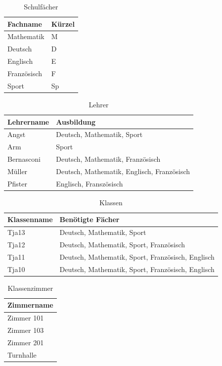 \begin{table}[ht]
\centering
  \begin{tabular}{ l | l }
	\hline
	\rowcolor{gray}
	\textbf{Fachname}	& \textbf{Kürzel}\\ \hline
	Mathematik		& M\\ \hline
	Deutsch		& D\\ \hline
	Englisch		& E\\ \hline
	Französisch		& F\\ \hline
	Sport			& Sp
  \end{tabular}
   \caption{Schulfächer}\label{table:eg_subject}
\end{table}

\begin{table}[ht]
\centering
  \begin{tabular}{ l | l }
	\hline
	\rowcolor{gray}
	\textbf{Lehrername} 	& \textbf{Ausbildung}\\ \hline
	Angst				& Deutsch, Mathematik, Sport\\ \hline
	Arm				& Sport\\ \hline
	Bernasconi			& Deutsch, Mathematik, Französisch\\ \hline
	Müller				& Deutsch, Mathematik, Englisch, Französisch\\ \hline
	Pfister				& Englisch, Franszösisch
  \end{tabular}
   \caption{Lehrer}\label{table:eg_teacher}
\end{table}

\begin{table}[ht]
\centering
  \begin{tabular}{ l | l }
	\hline
	\rowcolor{gray}
	\textbf{Klassenname} 	& \textbf{Benötigte Fächer}\\ \hline
	Tja13				& Deutsch, Mathematik, Sport\\ \hline
	Tja12				& Deutsch, Mathematik, Sport, Französisch\\ \hline
	Tja11				& Deutsch, Mathematik, Sport, Französisch, Englisch\\ \hline
	Tja10				& Deutsch, Mathematik, Sport, Französisch, Englisch
  \end{tabular}
   \caption{Klassen}\label{table:eg_schoolclasses}
\end{table}

\begin{table}[ht]
\centering
  \begin{tabular}{ l }
	\hline
	\rowcolor{gray}
	\textbf{Zimmername}\\ \hline
	Zimmer 101\\ \hline
	Zimmer 103\\ \hline
	Zimmer 201\\ \hline
	Turnhalle
  \end{tabular}
   \caption{Klassenzimmer}\label{table:eg_schoolroom}
\end{table}

